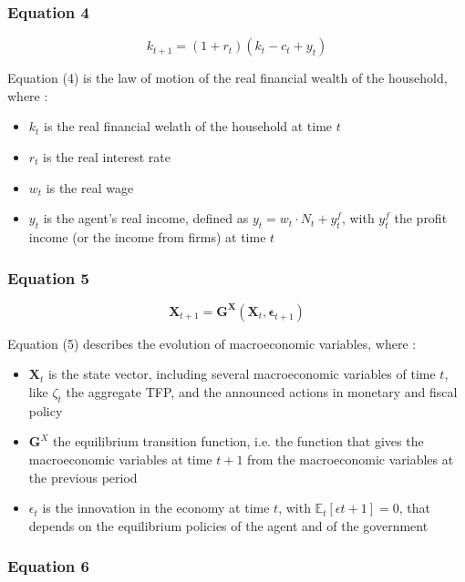 \documentclass{article}
\begin{document}

\subsubsection*{Equation 4}
\begin{equation}
    k_{t+1}=(1+r_t)(k_{t}-c_{t}+y_{t})
\end{equation}

Equation (4) is the law of motion of the real financial wealth of the household, where : 
\begin{itemize}
    \item $k_t$ is the real financial welath of the household at time $t$
    \item $r_t$ is the real interest rate
    \item $w_t$ is the real wage
    \item $y_t$ is the agent's real income, defined as $y_t=w_t\cdot N_{t}+y_{t}^{f}$, with $y_{t}^{f}$ the profit income (or the income from firms) at time $t$
\end{itemize}

\subsubsection*{Equation 5}

\begin{equation}
    \bm{X}_{t+1}=\bm{G}^{\bm{X}}\left(\bm{X}_{t},\bm{\epsilon}_{t+1}\right)
\end{equation}

Equation (5) describes the evolution of macroeconomic variables, where : 
\begin{itemize}
    \item $\bm{X}_t$ is the state vector, including several macroeconomic variables of time $t$, like $\zeta_t$ the aggregate TFP, and the announced actions in monetary and fiscal policy
    \item $\bm{G}^X$ the equilibrium transition function, i.e. the function that gives the macroeconomic variables at time $t+1$ from the macroeconomic variables at the previous period
    \item $\epsilon_{t}$ is the innovation in the economy at time $t$, with $\mathbb{E}_{t}\left[\epsilon{t+1}\right]=0$, that depends on the equilibrium policies of the agent and of the government
\end{itemize}

\subsubsection*{Equation 6}
\end{document}
